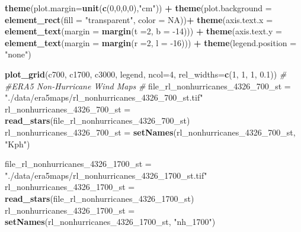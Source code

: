 \documentclass[12pt,twoside]{reedthesis}
\newenvironment{Shaded}{\begin{snugshade}}{\end{snugshade}}
\newcommand{\CommentTok}[1]{\textcolor[rgb]{0.56,0.35,0.01}{\textit{#1}}}
\newcommand{\DataTypeTok}[1]{\textcolor[rgb]{0.13,0.29,0.53}{#1}}
\newcommand{\DecValTok}[1]{\textcolor[rgb]{0.00,0.00,0.81}{#1}}
\newcommand{\FloatTok}[1]{\textcolor[rgb]{0.00,0.00,0.81}{#1}}
\newcommand{\KeywordTok}[1]{\textcolor[rgb]{0.13,0.29,0.53}{\textbf{#1}}}
\newcommand{\NormalTok}[1]{#1}
\newcommand{\OperatorTok}[1]{\textcolor[rgb]{0.81,0.36,0.00}{\textbf{#1}}}
\newcommand{\OtherTok}[1]{\textcolor[rgb]{0.56,0.35,0.01}{#1}}
\newcommand{\StringTok}[1]{\textcolor[rgb]{0.31,0.60,0.02}{#1}}
\begin{document}
\begin{Shaded}
\begin{Highlighting}[]
\StringTok{  }\KeywordTok{theme}\NormalTok{(}\DataTypeTok{plot.margin=}\KeywordTok{unit}\NormalTok{(}\KeywordTok{c}\NormalTok{(}\DecValTok{0}\NormalTok{,}\DecValTok{0}\NormalTok{,}\DecValTok{0}\NormalTok{,}\DecValTok{0}\NormalTok{),}\StringTok{"cm"}\NormalTok{)) }\OperatorTok{+}
\StringTok{  }\KeywordTok{theme}\NormalTok{(}\DataTypeTok{plot.background =} \KeywordTok{element_rect}\NormalTok{(}\DataTypeTok{fill =} \StringTok{"transparent"}\NormalTok{, }\DataTypeTok{color =} \OtherTok{NA}\NormalTok{))}\OperatorTok{+}
\StringTok{  }\KeywordTok{theme}\NormalTok{(}\DataTypeTok{axis.text.x =} \KeywordTok{element_text}\NormalTok{(}\DataTypeTok{margin =}  \KeywordTok{margin}\NormalTok{(}\DataTypeTok{t =}\DecValTok{2}\NormalTok{, }\DataTypeTok{b =} \DecValTok{-14}\NormalTok{))) }\OperatorTok{+}\StringTok{ }
\StringTok{  }\KeywordTok{theme}\NormalTok{(}\DataTypeTok{axis.text.y =} \KeywordTok{element_text}\NormalTok{(}\DataTypeTok{margin =}  \KeywordTok{margin}\NormalTok{(}\DataTypeTok{r =}\DecValTok{2}\NormalTok{, }\DataTypeTok{l =} \DecValTok{-16}\NormalTok{))) }\OperatorTok{+}
\StringTok{  }\KeywordTok{theme}\NormalTok{(}\DataTypeTok{legend.position =} \StringTok{"none"}\NormalTok{)}

\KeywordTok{plot_grid}\NormalTok{(c700, c1700, c3000, legend, }\DataTypeTok{ncol=}\DecValTok{4}\NormalTok{, }\DataTypeTok{rel_widths=}\KeywordTok{c}\NormalTok{(}\DecValTok{1}\NormalTok{, }\DecValTok{1}\NormalTok{, }\DecValTok{1}\NormalTok{, }\FloatTok{0.1}\NormalTok{))}
\CommentTok{#}
\CommentTok{#ERA5 Non-Hurricane Wind Maps}
\CommentTok{#}
\NormalTok{file_rl_nonhurricanes_}\DecValTok{4326}\NormalTok{_}\DecValTok{700}\NormalTok{_st =}\StringTok{ "./data/era5maps/rl_nonhurricanes_4326_700_st.tif"}
\NormalTok{rl_nonhurricanes_}\DecValTok{4326}\NormalTok{_}\DecValTok{700}\NormalTok{_st =}\StringTok{ }\KeywordTok{read_stars}\NormalTok{(file_rl_nonhurricanes_}\DecValTok{4326}\NormalTok{_}\DecValTok{700}\NormalTok{_st)}
\NormalTok{rl_nonhurricanes_}\DecValTok{4326}\NormalTok{_}\DecValTok{700}\NormalTok{_st =}\StringTok{ }\KeywordTok{setNames}\NormalTok{(rl_nonhurricanes_}\DecValTok{4326}\NormalTok{_}\DecValTok{700}\NormalTok{_st, }\StringTok{"Kph"}\NormalTok{)}

\NormalTok{file_rl_nonhurricanes_}\DecValTok{4326}\NormalTok{_}\DecValTok{1700}\NormalTok{_st =}\StringTok{ "./data/era5maps/rl_nonhurricanes_4326_1700_st.tif"}
\NormalTok{rl_nonhurricanes_}\DecValTok{4326}\NormalTok{_}\DecValTok{1700}\NormalTok{_st =}\StringTok{ }\KeywordTok{read_stars}\NormalTok{(file_rl_nonhurricanes_}\DecValTok{4326}\NormalTok{_}\DecValTok{1700}\NormalTok{_st)}
\NormalTok{rl_nonhurricanes_}\DecValTok{4326}\NormalTok{_}\DecValTok{1700}\NormalTok{_st =}\StringTok{ }\KeywordTok{setNames}\NormalTok{(rl_nonhurricanes_}\DecValTok{4326}\NormalTok{_}\DecValTok{1700}\NormalTok{_st, }\StringTok{"nh_1700"}\NormalTok{)}


\end{Highlighting}
\end{Shaded}
\end{document}
